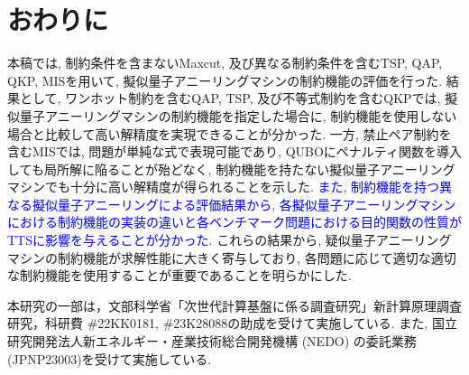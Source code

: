 \documentclass[submit,techrep,noauthor]{ipsj}
\begin{document}
\section{おわりに}
本稿では, 制約条件を含まないMaxcut, 及び異なる制約条件を含むTSP, QAP, QKP, MISを用いて, 擬似量子アニーリングマシンの制約機能の評価を行った. 結果として, ワンホット制約を含むQAP, TSP, 及び不等式制約を含むQKPでは, 擬似量子アニーリングマシンの制約機能を指定した場合に, 制約機能を使用しない場合と比較して高い解精度を実現できることが分かった. 一方, 禁止ペア制約を含むMISでは, 問題が単純な式で表現可能であり, QUBOにペナルティ関数を導入しても局所解に陥ることが殆どなく, 制約機能を持たない擬似量子アニーリングマシンでも十分に高い解精度が得られることを示した. \textcolor{blue}{また, 制約機能を持つ異なる擬似量子アニーリングによる評価結果から, 各擬似量子アニーリングマシンにおける制約機能の実装の違いと各ベンチマーク問題における目的関数の性質がTTSに影響を与えることが分かった. }これらの結果から, 疑似量子アニーリングマシンの制約機能が求解性能に大きく寄与しており, 各問題に応じて適切な適切な制約機能を使用することが重要であることを明らかにした.

\begin{acknowledgment}
本研究の一部は，文部科学省「次世代計算基盤に係る調査研究」新計算原理調査研究，科研費 \#22KK0181, \#23K28088の助成を受けて実施している. また, 国立研究開発法人新エネルギー・産業技術総合開発機構 (NEDO) の委託業務 (JPNP23003)を受けて実施している.
\end{acknowledgment}
\end{document}
